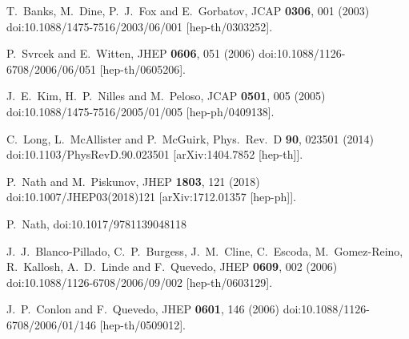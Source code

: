 \documentclass[12pt]{article}
\begin{document}
\begin{thebibliography}{99}
  T.~Banks, M.~Dine, P.~J.~Fox and E.~Gorbatov,
  JCAP {\bf 0306}, 001 (2003)
  doi:10.1088/1475-7516/2003/06/001
  [hep-th/0303252].


  P.~Svrcek and E.~Witten,
  JHEP {\bf 0606}, 051 (2006)
  doi:10.1088/1126-6708/2006/06/051
  [hep-th/0605206].


  J.~E.~Kim, H.~P.~Nilles and M.~Peloso,
  JCAP {\bf 0501}, 005 (2005)
  doi:10.1088/1475-7516/2005/01/005
  [hep-ph/0409138].


  C.~Long, L.~McAllister and P.~McGuirk,
  Phys.\ Rev.\ D {\bf 90}, 023501 (2014)
  doi:10.1103/PhysRevD.90.023501
  [arXiv:1404.7852 [hep-th]].


  P.~Nath and M.~Piskunov,
  JHEP {\bf 1803}, 121 (2018)
  doi:10.1007/JHEP03(2018)121
  [arXiv:1712.01357 [hep-ph]].


  P.~Nath,
  doi:10.1017/9781139048118


  J.~J.~Blanco-Pillado, C.~P.~Burgess, J.~M.~Cline, C.~Escoda, M.~Gomez-Reino, R.~Kallosh, A.~D.~Linde and F.~Quevedo,
  JHEP {\bf 0609}, 002 (2006)
  doi:10.1088/1126-6708/2006/09/002
  [hep-th/0603129].


  J.~P.~Conlon and F.~Quevedo,
  JHEP {\bf 0601}, 146 (2006)
  doi:10.1088/1126-6708/2006/01/146
  [hep-th/0509012].



\end{thebibliography}
\end{document}

